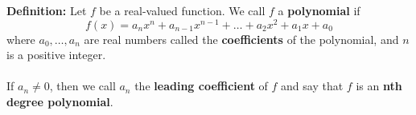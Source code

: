 \documentclass{article}
\begin{document}
	\textbf{Definition:} Let $f$ be a real-valued function. We call $f$ a \textbf{polynomial} if
	$$f(x) = a_nx^n + a_{n-1}x^{n-1} + \ldots + a_2x^2 + a_1x + a_0$$
	where $a_0, \ldots, a_n$ are real numbers called the \textbf{coefficients} of the polynomial,
	and $n$ is a positive integer. \\\\
	If $a_n \neq 0$, then we call $a_n$ the \textbf{leading coefficient} of $f$ and say that $f$ is an \textbf{nth degree polynomial}.
\end{document}
